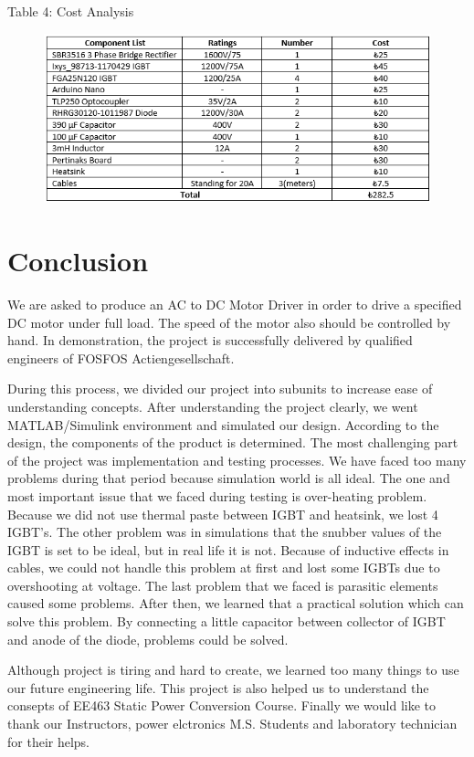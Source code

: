 \documentclass{article}
\begin{document}
\noindent Table 4: Cost Analysis
\begin{figure}[H]
\centering
\includegraphics[scale=0.9]{cost}
\label{fig:members}
\end{figure} 

\newpage
\section{Conclusion}
We are asked to produce an AC to DC Motor Driver in order to drive a specified DC motor under full load. The speed of the motor also should be controlled by hand. In demonstration, the project is successfully delivered by qualified engineers of FOSFOS Actiengesellschaft.
\par During this process, we divided our project into subunits to increase ease of understanding concepts. After understanding the project clearly, we went MATLAB/Simulink environment and simulated our design. According to the design, the components of the product is determined. The most challenging part of the project was implementation and testing processes. We have faced too many problems during that period because simulation world is all ideal. The one and most important issue that we faced during testing is over-heating problem. Because we did not use thermal paste between IGBT and heatsink, we lost 4 IGBT's. The other problem was in simulations that the snubber values of the IGBT is set to be ideal, but in real life it is not. Because of inductive effects in cables, we could not handle this problem at first and lost some IGBTs due to overshooting at voltage. The last problem that we faced is parasitic elements caused some problems. After then, we learned that a practical solution which can solve this problem. By connecting a little capacitor between collector of IGBT and anode of the diode, problems could be solved.

\par Although project is tiring and hard to create, we learned too many things to use our future engineering life. This project is also helped us to understand the consepts of EE463 Static Power Conversion Course. Finally we would like to thank our Instructors, power elctronics M.S. Students and laboratory technician for their helps.
\end{document}
